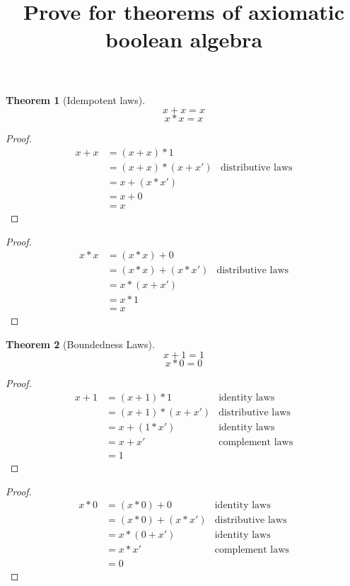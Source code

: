 \documentclass{article}
\newtheorem{theorem}{Theorem}[section]
\begin{document}
\title{Prove for theorems of axiomatic boolean algebra}

\begin{theorem}[Idempotent laws]
\label{idempotent}
\[ x + x = x \]
\[ x * x = x \]
\end{theorem}

\begin{proof}
\begin{align*}
x + x & = (x + x) * 1 \\
      & = (x + x) * (x + x') & \text{distributive laws} \\
      & = x + (x * x') \\
      & = x + 0 \\
      & = x
\end{align*}
\end{proof}

\begin{proof}
\begin{align*}
x * x & = (x * x) + 0 \\
      & = (x * x) + (x * x') & \text{distributive laws} \\
      & = x * (x + x') \\
      & = x * 1 \\
      & = x
\end{align*}
\end{proof}

\newpage
\begin{theorem}[Boundedness Laws]
\label{boundedness}
\[ x + 1 = 1 \]
\[ x * 0 = 0 \]
\end{theorem}

\begin{proof}
\begin{align*}
x + 1 & = (x + 1) * 1 & \text{identity laws} \\
      & = (x + 1) * (x + x') & \text{distributive laws} \\
      & = x + (1 * x') & \text{identity laws} \\
      & = x + x' & \text{complement laws} \\
      & = 1
\end{align*}
\end{proof}

\begin{proof}
\begin{align*}
x * 0 & = (x * 0) + 0 & \text{identity laws}  \\
      & = (x * 0) + (x * x') & \text{distributive laws} \\
      & = x * (0 + x') & \text{identity laws} \\
      & = x * x' & \text{complement laws} \\
      & = 0
\end{align*}
\end{proof}
\end{document}

